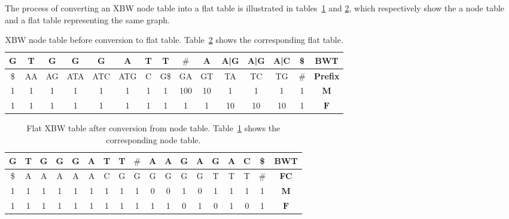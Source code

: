 \documentclass[a4paper,12pt,twoside,BCOR=10mm]{scrbook}
\begin{document}
The process of converting an XBW node table into a flat table is illustrated in tables~\ref{table:evo_node_to_flat_node} 
and \ref{table:evo_node_to_flat_flat}, which respectively show the a node table and a flat table representing the same graph. \\
{
\renewcommand{\tabcolsep}{5pt}
\begin{table}[htb]
\centering
\caption[XBW node table before conversion to flat table]{XBW node table before conversion to flat table. 
Table~\ref{table:evo_node_to_flat_flat} shows the corresponding flat table.}
\begin{tabular}{ | c | c | c | c | c | c | c | c | c | c | c | c | c | c | c | }
\hline
G & T & G & G & G & A & T & T & $\#$ & A & A|G & A|G & A|C & \$ & \textbf{BWT} \\ \hline 
\$ & AA & AG & ATA & ATC & ATG & C & G\$ & GA & GT & TA & TC & TG & $\#$ & \textbf{Prefix} \\ \hline 
1 & 1 & 1 & 1 & 1 & 1 & 1 & 1 & 100 & 10 & 1 & 1 & 1 & 1 & $\boldsymbol{M}$ \\ \hline 
1 & 1 & 1 & 1 & 1 & 1 & 1 & 1 & 1 & 1 & 10 & 10 & 10 & 1 & $\boldsymbol{F}$ \\ \hline 
\end{tabular}
\label{table:evo_node_to_flat_node}
\end{table}
}
\begin{table}[htb]
\centering
\caption[Flat XBW table after conversion from node table]{Flat XBW table after conversion from node table. 
Table~\ref{table:evo_node_to_flat_node} shows the corresponding node table.}
\begin{tabular}{ | c | c | c | c | c | c | c | c | c | c | c | c | c | c | c | c | c | c | }
\hline
G & T & G & G & G & A & T & T & $\#$ & A & A & G & A & G & A & C & \$ & \textbf{BWT} \\ \hline 
\$ & A & A & A & A & A & C & G & G & G & G & G & G & T & T & T & $\#$ & \textbf{FC} \\ \hline 
1 & 1 & 1 & 1 & 1 & 1 & 1 & 1 & 1 & 0 & 0 & 1 & 0 & 1 & 1 & 1 & 1 & $\boldsymbol{M}$ \\ \hline 
1 & 1 & 1 & 1 & 1 & 1 & 1 & 1 & 1 & 1 & 1 & 0 & 1 & 0 & 1 & 0 & 1 & $\boldsymbol{F}$ \\ \hline
\end{tabular}
\label{table:evo_node_to_flat_flat}
\end{table}
\end{document}
